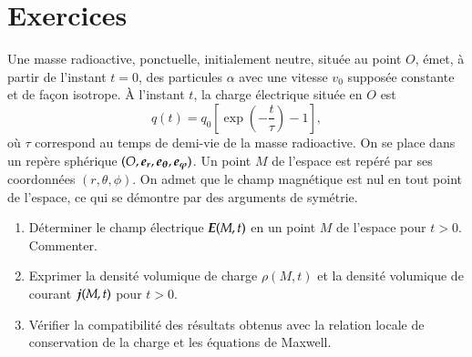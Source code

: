 \section{Exercices}

\begin{exocor} 
	Une masse radioactive, ponctuelle, initialement neutre, située au point $O$,
	émet, à partir de l'instant $t = 0$, des particules $\alpha$ avec une vitesse
	$v_0$ supposée constante et de façon isotrope. À l'instant $t$, la charge 
	électrique située en $O$ est
	\begin{equation*}
		q(t) = q_0 \left[\exp\left(-\dfrac{t}{\tau}\right) - 1\right],
	\end{equation*}
	où $\tau$ correspond au temps de demi-vie de la masse radioactive. 
	On se place dans un repère sphérique $(O, \er, \etheta, \ephi)$. Un point
	$M$ de l'espace est repéré par ses coordonnées $(r, \theta, \phi)$. 
	On admet que le champ magnétique est nul en tout point de 
	l'espace, ce qui se démontre par des arguments de symétrie. 
	\begin{enumerate}
		\item Déterminer le champ électrique $\vece(M, t)$ 
		  en un point $M$ de l'espace pour $t > 0$.
		  Commenter.
		\item Exprimer la densité volumique de charge $\rho(M, t)$ et la
		  densité volumique de courant $\vecj(M, t)$ pour $t > 0$.
		\item Vérifier la compatibilité des résultats obtenus avec la 
		  relation locale de conservation de la charge et les équations de 
		  Maxwell.
	\end{enumerate}
\end{exocor}

